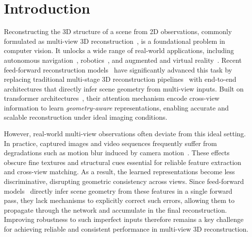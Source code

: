 \documentclass{llmxive}
\begin{document}
% 
\section{Introduction}
\label{sec:intro}

Reconstructing the 3D structure of a scene from 2D observations, commonly formulated as multi-view 3D reconstruction~\cite{hartley2003multiple, schonberger2016structure, furukawa2010towards, rosinol2020kimera, cramariuc2022maplab}, is a foundational problem in computer vision. It unlocks a wide range of real-world applications, including autonomous navigation~\cite{ceccarelli2022rgb, vargas2021overview, zhu2024llava}, robotics~\cite{kim2015real, lingbot-depth2026, 9506550}, and augmented and virtual reality~\cite{park2011handling, wloka1996interactive, okumura2006augmented}. Recent feed-forward reconstruction models~\cite{depthanything3, wang2025vggt, wang2025pi, wang2024dust3r, leroy2024grounding} have significantly advanced this task by replacing traditional multi-stage 3D reconstruction pipelines~\cite{hartley2003multiple, schonberger2016structure, 
furukawa2010towards} with end-to-end architectures that directly infer scene geometry from multi-view inputs. Built on transformer architectures~\cite{vaswani2017attention, dosovitskiy2020image}, their attention mechanism encode cross-view information to learn \textit{geometry-aware} representations, enabling accurate and scalable reconstruction under ideal imaging conditions.


However, real-world multi-view observations often deviate from this ideal setting. In practice, captured images and video sequences frequently suffer from degradations such as motion blur induced by camera motion~\cite{nah2017deep, rim2020real, malyugina2025unsupervised, liu2024boosting, han2025emergent}. These effects obscure fine textures and structural cues essential for reliable feature extraction and cross-view matching. As a result, the learned representations become less discriminative, disrupting geometric consistency across views. Since feed-forward models~\cite{depthanything3, wang2025vggt, wang2025pi, wang2024dust3r, leroy2024grounding} directly infer scene geometry from these features in a single forward pass, they lack mechanisms to explicitly correct such errors, allowing them to propagate through the network and accumulate in the final reconstruction. Improving robustness to such imperfect inputs therefore remains a key challenge for achieving reliable and consistent performance in multi-view 3D reconstruction.
\end{document}

